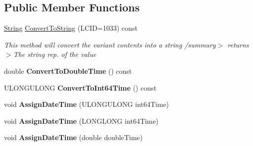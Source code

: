 \subsection*{Public Member Functions}
\begin{DoxyCompactItemize}
\item 
\mbox{\label{class_canberra_1_1_utility_1_1_core_1_1_variant_aa6addf94f64b2cf188e413a465759d1d}} 
\hyperlink{class_canberra_1_1_utility_1_1_core_1_1_string}{String} \hyperlink{class_canberra_1_1_utility_1_1_core_1_1_variant_aa6addf94f64b2cf188e413a465759d1d}{Convert\+To\+String} (L\+C\+ID=1033) const
\begin{DoxyCompactList}\small\item\em This method will convert the variant contents into a string /summary$>$ returns$>$The string rep. of the value\end{DoxyCompactList}\item 
\mbox{\label{class_canberra_1_1_utility_1_1_core_1_1_variant_a119fcf7d42eedaf3ef1bda15e136234e}} 
double {\bfseries Convert\+To\+Double\+Time} () const
\item 
\mbox{\label{class_canberra_1_1_utility_1_1_core_1_1_variant_ae4c838f2872392e71fbc218b071ec95d}} 
U\+L\+O\+N\+G\+U\+L\+O\+NG {\bfseries Convert\+To\+Int64\+Time} () const
\item 
\mbox{\label{class_canberra_1_1_utility_1_1_core_1_1_variant_a9b2479cd3519c4b4c6740204bb233b60}} 
void {\bfseries Assign\+Date\+Time} (U\+L\+O\+N\+G\+U\+L\+O\+NG int64\+Time)
\item 
\mbox{\label{class_canberra_1_1_utility_1_1_core_1_1_variant_aa77b3e764e9f5053d0508d3bdaea37e1}} 
void {\bfseries Assign\+Date\+Time} (L\+O\+N\+G\+L\+O\+NG int64\+Time)
\item 
\mbox{\label{class_canberra_1_1_utility_1_1_core_1_1_variant_a3131c5d1e098a5ba773f02b952c2a2eb}} 
void {\bfseries Assign\+Date\+Time} (double double\+Time)
\item 
\mbox{\label{class_canberra_1_1_utility_1_1_core_1_1_variant_a47d904851779630386141d674e620280}} 

\end{DoxyCompactItemize}
